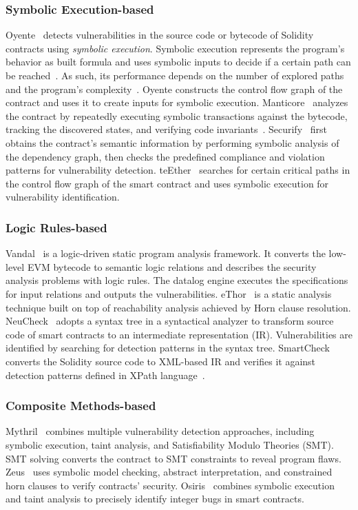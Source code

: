 \subsubsection{Symbolic Execution-based}
{Oyente}~\cite{ethereum-background-03} detects vulnerabilities in the source code or bytecode of Solidity contracts using \textit{symbolic execution}. 
Symbolic execution represents the program's behavior as built formula and uses symbolic inputs to decide if a certain path can be reached~\cite{king1976symbolic}.
As such, its performance depends on the number of explored paths and the program's complexity~\cite{rw_tech_01, rw_tech_02}. 
Oyente constructs the control flow graph of the contract and uses it to create inputs for symbolic execution. 
{Manticore}~\cite{rw_manticore_paper} analyzes the contract by repeatedly executing symbolic transactions against the bytecode, tracking the discovered states, and verifying code invariants~\cite{rw_manticore_repo}.
{Securify}~\cite{rw_securify_paper}
first obtains the contract's semantic information by performing symbolic analysis of the dependency graph, then checks the predefined compliance and violation patterns for vulnerability detection. 
teEther~\cite{teether} searches for certain critical paths in the control flow graph of the smart contract and uses symbolic execution for vulnerability identification. 

\subsubsection{Logic Rules-based}
Vandal~\cite{brent2018vandal} is a logic-driven static program analysis framework.  
It converts the low-level EVM bytecode to semantic logic relations and describes the security analysis problems with logic rules. The datalog engine executes the specifications for input relations and outputs the vulnerabilities. %
{eThor}~\cite{ethor} is a static analysis technique built on top of reachability analysis achieved by Horn clause resolution.  
{NeuCheck}~\cite{NeuCheck} adopts a syntax tree in a syntactical analyzer to transform source code of smart contracts to an intermediate representation (IR). Vulnerabilities are identified by searching for detection patterns in the syntax tree. 
{SmartCheck}~\cite{smartcheck} converts the Solidity source code to XML-based IR and verifies it against detection patterns defined in XPath language~\cite{xpath}. 

\subsubsection{Composite Methods-based}
Mythril~\cite{rw_mythx_article} combines multiple vulnerability detection approaches, including symbolic execution, taint analysis, and Satisfiability Modulo Theories (SMT). SMT solving converts the contract to SMT constraints to reveal program flaws. 
{Zeus}~\cite{zeus} uses symbolic model checking, abstract interpretation, and constrained horn clauses to verify contracts' security. 
{Osiris}~\cite{osiris} combines symbolic execution and taint analysis to precisely identify integer bugs in smart contracts. 

